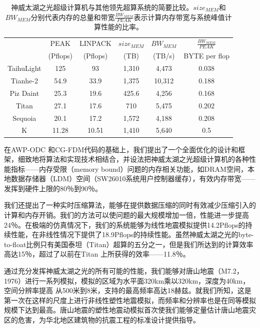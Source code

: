 \documentclass[degree=doctor]{thuthesis}
\begin{document}
\begin{table}[!t]
\footnotesize
\caption{神威太湖之光超级计算机与其他领先超算系统的简要比较。$size_{MEM}$和$BW_{MEM}$分别代表内存的总量和带宽$\frac{BW_{MEM}}{PEAK}$表示计算内存带宽与系统峰值计算性能的比率。}
\label{tb:supercomputer-comp}
\center
\begin{tabular*}{0.8\columnwidth}{cccccc}
\hline\hline
   & PEAK & LINPACK & $size_{MEM}$  & $BW_{MEM}$ & $\frac{BW_{MEM}}{PEAK}$ \\
   & (Pflops) & (Pflops) & (TB) & (TB/s) & {BYTE per flop} \\
   \hline\hline
   TaihuLight & 125 & 93 & 1,310 & 4,473 & 0.038 \\\hline
   Tianhe-2 & 54.9 & 33.9 & 1,375 & 10,312 & 0.188 \\\hline
   Piz Daint & 25.3 & 19.6 & 425.6 & 4,256 & 0.168 \\\hline
   Titan & 27.1 & 17.6 & 710 & 5,475 & 0.202 \\\hline
   Sequoia & 20.1 & 17.2 & 1,572 & 4,188 & 0.208 \\\hline
   K & 11.28 & 10.51 & 1,410 & 5,640 & 0.5 \\\hline
\hline
\end{tabular*}
\end{table}

在AWP-ODC \citep{cui2010scalable}和CG-FDM\citep{zhang2014three}代码的基础上，我们提出了一个全面优化的设计和框架，细致地将算法和实现技术相结合，并设法把神威太湖之光超级计算机的各种性能指标——内存受限（memory bound）问题的内存相关功能，如DRAM空间，本地数据存储器（LDM）空间（SW26010系统用户控制器缓存），有效内存带宽——发挥到硬件上限的80％到90％。

我们还提出了一种实时压缩算法，能够在提供数据压缩的同时有效减少压缩引入的计算和内存开销。我们的方法可以使问题的最大规模增加一倍，性能进一步提高24％。在极端的仿真情况下，我们的系统能够为线性地震模拟提供14.2Pflops的持续性能，在非线性情况下提供了18.9Pflops的持续性能。虽然神威太湖之光的byte-to-float比例只有美国泰坦（Titan）超算的五分之一，但是我们所达到的计算效率高达15％，超过了以前在Titan \citep{roten2016high}上所获得的效率——11.8％。

通过充分发挥神威太湖之光的所有可能的性能，我们能够对唐山地震（M7.2，1976）进行一系列模拟，模拟的区域为水平面320km乘以320km，深度为40km，空间分辨率提高 从500米到8米，支持的最高频率高达18赫兹。就我们所知，这是第一次在这样的尺度上进行非线性塑性地震模拟，而频率和分辨率也是在同等模拟规模下达到最高。唐山地震的塑性地震动模拟首次使我们能够定量估计唐山地震灾区的危害，为华北地区建筑物的抗震工程的标准设计提供指导。
\end{document}
